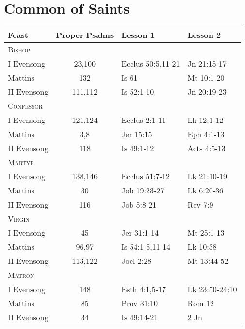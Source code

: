 \section{Common of Saints}
\begin{longtable}{l c l l}
\multicolumn{1}{l}{Feast}&\multicolumn{1}{l}{Proper Psalms}&\multicolumn{1}{l}{Lesson 1}& \multicolumn{1}{l}{Lesson 2}\\
\hline
\endhead
\multicolumn{4}{l}{\textsc{Bishop}}\\
\hspace{1em} I Evensong&23,100&Ecclus 50:5,11-21&Jn 21:15-17\\
\hspace{1em} Mattins&132&Is 61&Mt 10:1-20\\
\hspace{1em} II Evensong&111,112&Is 52:1-10&Jn 20:19-23\\
%
\multicolumn{4}{l}{\textsc{Confessor}}\\
\hspace{1em} I Evensong&121,124&Ecclus 2:1-11&Lk 12:1-12\\
\hspace{1em} Mattins&3,8&Jer 15:15&Eph 4:1-13\\
\hspace{1em} II Evensong&118&Is 49:1-12&Acts 4:5-13\\
%
\multicolumn{4}{l}{\textsc{Martyr}}\\
\hspace{1em} I Evensong&138,146&Ecclus 51:7-12&Lk 21:10-19\\
\hspace{1em} Mattins&30&Job 19:23-27&Lk 6:20-36\\
\hspace{1em} II Evensong&116&Job 5:8-21&Rev 7:9\\
%
\multicolumn{4}{l}{\textsc{Virgin}}\\
\hspace{1em} I Evensong&45&Jer 31:1-14&Mt 25:1-13\\
\hspace{1em} Mattins&96,97&Is 54:1-5,11-14&Lk 10:38\\
\hspace{1em} II Evensong&113,122&Joel 2:28&Mt 13:44-52\\
%
\multicolumn{4}{l}{\textsc{Matron}}\\
\hspace{1em} I Evensong&148&Esth 4:1,5-17&Lk 23:50-24:10\\
\hspace{1em} Mattins&85&Prov 31:10&Rom 12\\
\hspace{1em} II Evensong&34&Is 49:14-21&2 Jn\\
\end{longtable}